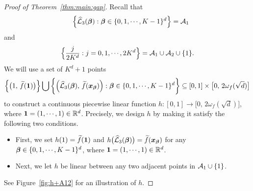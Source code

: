 \documentclass[nohyperref]{article}
\theoremstyle{plain}
\theoremstyle{definition}
\theoremstyle{remark}
\begin{document}
\begin{proof}[Proof of Theorem~\ref{thm:main:gap}]
Recall that
\begin{equation*}
	\quad \Big\{\hatcalL_3(\bmbeta):\bm{\beta}\in \{0,1,\dotsc,K-1\}^d\Big\}= \calA_1
\end{equation*}
and 
\begin{equation*}
	\Big\{\frac{j}{2K^d}: j=0,1,\dotsc,2K^d\Big\}=\calA_1\cup\calA_2\cup\{1\}.
\end{equation*} 
We will use a set of  $K^d+1$ points  
\begin{equation*}
	\Big\{\big(1,\, \tildef(\bm{1})\big)\Big\}\bigcup \bigg\{\Big(\hatcalL_3(\bmbeta),\, \tildef(\bmx_\bmbeta)\Big): 
	\bmbeta\in \{0,1,\dotsc,K-1\}^d\bigg\}
	\subseteq [0,1]\times \big[0,\,2\omega_f(\sqrt{d})\big]
\end{equation*}
to construct a continuous piecewise linear function $h:[0,1]\to \big[0,\,2\omega_f(\sqrt{d})\big]$, where $\bm{1}=(1,\dotsc,1)\in \R^d$.
Precisely, we design $h$ by making it satisfy the following two conditions.
\begin{itemize}
	\item First, we set $h(1)={\widetilde{f}}(\bm{1})$ and $h\big({\mathcal{\widehat{L}}}_3({\bm{\beta}})\big)={\widetilde{f}}({\bm{x}}_{\bm{\beta}})$ for any $\bmbeta\in \{0,1,\dotsc,K-1\}^d$, where $\bm{1}=(1,\dotsc,1)\in \R^d$.
	\item Next, we let $h$ be linear between any two adjacent points in ${\mathcal{A}}_1\cup\{1\}$.
\end{itemize} 
See Figure~\ref{fig:h+A12} for an illustration of $h$.
%
%	
%	

\end{proof}
\end{document}
